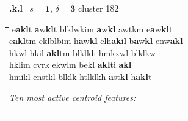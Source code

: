 \begin{figure}[!t]
\begin{mdframed}
\vspace{2pt}
{ \textbf{.k.l}} \,{} \hfill {$s = \mathbf{1}$, $\delta = \mathbf{3}$} \hfill { cluster 182}%
\vspace{3pt}
\begin{normalsize}
\begin{tabbing}
\hspace*{15ex}\= \hspace*{16ex}\=\hspace*{16ex}\=\hspace*{16ex}\=\hspace*{16ex}\=\hspace*{13ex} \kill
e\textbf{a}\textbf{k}\textbf{l}t \> \textbf{a}w\textbf{k}\textbf{l}t \> blklwkim \> \textbf{a}w\textbf{k}\textbf{l} \> awtkm \> e\textbf{a}w\textbf{k}\textbf{l}t \\
e\textbf{a}\textbf{k}\textbf{l}tm \> eklblbim \> h\textbf{a}w\textbf{k}\textbf{l} \> elh\textbf{a}\textbf{k}i\textbf{l} \> b\textbf{a}w\textbf{k}\textbf{l} \> enw\textbf{a}\textbf{k}\textbf{l} \\
hkwl \> hkil \> \textbf{a}\textbf{k}\textbf{l}tm \> blklkh \> hmkxwl \> blklkw \\
hklim \> cvrk \> ekwlm \> bekl \> \textbf{a}\textbf{k}\textbf{l}ti \> \textbf{a}\textbf{k}\textbf{l} \\
hmikl \> enstkl \> blklk \> htlklkh \> \textbf{a}st\textbf{k}\textbf{l} \> h\textbf{a}\textbf{k}\textbf{l}t 
\end{tabbing}
\end{normalsize}
\vspace{3pt}
\begin{mdframed}
\begin{small}
\textit{Ten most active centroid features:}
\vspace{-5pt}
\begin{tabbing}
\hspace*{6ex}\= \hspace*{12ex}\= \hspace*{6ex}\= \hspace*{12ex}\= \hspace*{6ex} \= \hspace*{12ex} \= \hspace*{6ex}\= \hspace*{12ex} \= \hspace*{6ex} \= \hspace*{10ex}\kill

\end{tabbing}
\end{small}
\end{mdframed}
\end{mdframed}
\end{figure}
